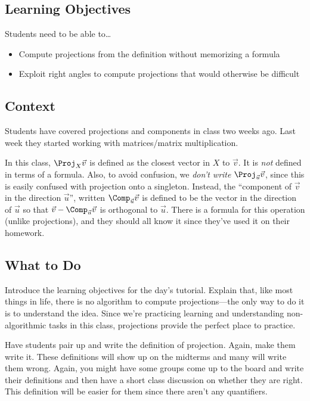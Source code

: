 \subsection*{Learning Objectives}
	Students need to be able to\ldots
	\begin{itemize}
		\item Compute projections from the definition without memorizing a formula
		\item Exploit right angles to compute projections that would otherwise be
			difficult
	\end{itemize}

\subsection*{Context}
	Students have covered projections and components in class two weeks ago. Last week they started
		working with matrices/matrix multiplication.

	In this class, $\Proj_X\vec v$ is defined as the closest vector in $X$ to $\vec v$. It is \emph{not}
		defined in terms of a formula. Also, to avoid confusion, we \emph{don't write}
		$\Proj_{\vec u}\vec v$, since this is easily confused with projection onto a singleton.
		Instead, the ``component of $\vec v$ in the direction $\vec u$'', written $\Comp_{\vec u}\vec v$
		is defined to be the vector in the direction of $\vec u$ so that $\vec v-\Comp_{\vec u}\vec v$
		is orthogonal to $\vec u$. There is a formula for this operation (unlike projections), and they
		should all know it since they've used it on their homework.

\subsection*{What to Do}
	Introduce the learning objectives for the day's tutorial. Explain that, like most things in life,
		there is no algorithm to compute projections---the only way to do it is to understand
		the idea. Since we're practicing learning and understanding non-algorithmic tasks in this
		class, projections provide the perfect place to practice.

	Have students pair up and write the definition of projection. Again, make them
		write it. These definitions will show up on the midterms and many will
		write them wrong. Again, you might have some groups come up to the board and
		write their definitions and then have a short class discussion on whether they are right.
		This definition will be easier for them since there aren't any quantifiers.

